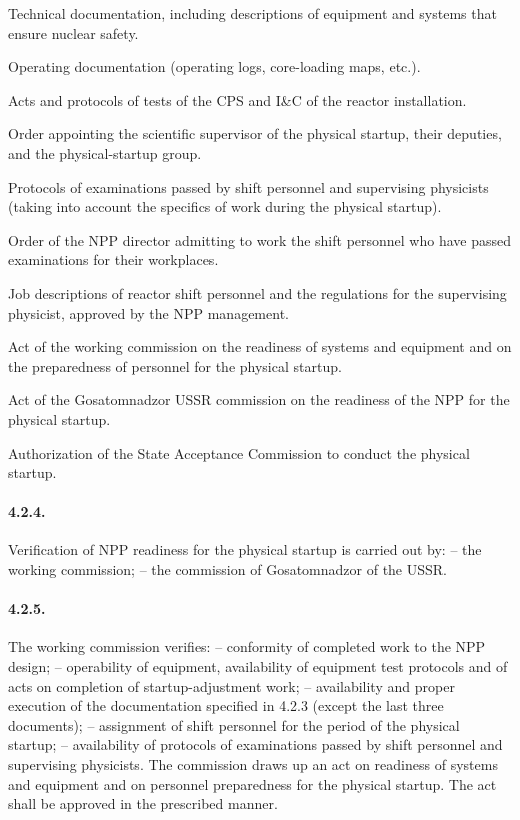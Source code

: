 \documentclass[openright]{bookest}
\begin{document}
Technical documentation, including descriptions of equipment and systems that ensure nuclear safety.

Operating documentation (operating logs, core-loading maps, etc.).

Acts and protocols of tests of the CPS and I\&C of the reactor installation.

Order appointing the scientific supervisor of the physical startup, their deputies, and the physical-startup group.

Protocols of examinations passed by shift personnel and supervising physicists (taking into account the specifics of work during the physical startup).

Order of the NPP director admitting to work the shift personnel who have passed examinations for their workplaces.

Job descriptions of reactor shift personnel and the regulations for the supervising physicist, approved by the NPP management.

Act of the working commission on the readiness of systems and equipment and on the preparedness of personnel for the physical startup.

Act of the Gosatomnadzor USSR commission on the readiness of the NPP for the physical startup.

Authorization of the State Acceptance Commission to conduct the physical startup.

\paragraph{4.2.4.} Verification of NPP readiness for the physical startup is carried out by:
-- the working commission;
-- the commission of Gosatomnadzor of the USSR.

\paragraph{4.2.5.} The working commission verifies:
-- conformity of completed work to the NPP design;
-- operability of equipment, availability of equipment test protocols and of acts on completion of startup-adjustment work;
-- availability and proper execution of the documentation specified in 4.2.3 (except the last three documents);
-- assignment of shift personnel for the period of the physical startup;
-- availability of protocols of examinations passed by shift personnel and supervising physicists.
The commission draws up an act on readiness of systems and equipment and on personnel preparedness for the physical startup. The act shall be approved in the prescribed manner.
\end{document}
